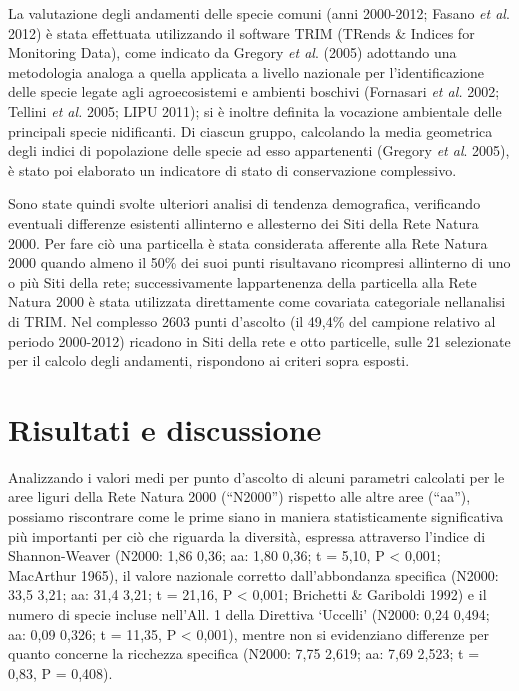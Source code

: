La valutazione degli andamenti delle specie comuni (anni 2000-2012;
Fasano \textit{et al}. 2012) \`e stata effettuata utilizzando il
software TRIM (TRends \& Indices for Monitoring Data), come indicato da
Gregory \textit{et al}. (2005) adottando una metodologia analoga a
quella applicata a livello nazionale per
l{\textquoteright}identificazione delle specie legate agli
agroecosistemi e ambienti boschivi (Fornasari \textit{et al.} 2002;
Tellini \textit{et al.} 2005; LIPU 2011); si \`e inoltre definita la
vocazione ambientale delle principali specie nidificanti. Di ciascun
gruppo, calcolando la media geometrica degli indici di popolazione
delle specie ad esso appartenenti (Gregory \textit{et al}. 2005), \`e
stato poi elaborato un indicatore\textbf{ }di stato di conservazione
complessivo.

Sono state quindi svolte ulteriori analisi di tendenza demografica,
verificando eventuali differenze esistenti all{\textquotesingle}interno
e all{\textquotesingle}esterno dei Siti della Rete Natura 2000. Per
fare ci\`o una particella \`e stata considerata afferente alla Rete
Natura 2000 quando almeno il 50\% dei suoi punti risultavano ricompresi
all{\textquotesingle}interno di uno o pi\`u Siti della rete;
successivamente l{\textquotesingle}appartenenza della particella alla
Rete Natura 2000 \`e stata utilizzata direttamente come covariata
categoriale nell{\textquotesingle}analisi di TRIM. Nel complesso 2603
punti d{\textquoteright}ascolto (il 49,4\% del campione relativo al
periodo 2000-2012) ricadono in Siti della rete e otto particelle, sulle
21 selezionate per il calcolo degli andamenti, rispondono ai criteri
sopra esposti.

\section*{Risultati e discussione}

Analizzando i valori medi per punto d{\textquoteright}ascolto di alcuni
parametri calcolati per le aree liguri della Rete Natura 2000
({\textquotedblleft}N2000{\textquotedblright}) rispetto alle altre aree
({\textquotedblleft}aa{\textquotedblright}), possiamo riscontrare come
le prime siano in maniera statisticamente significativa pi\`u
importanti per ci\`o che riguarda la diversit\`a, espressa attraverso
l{\textquoteright}indice di Shannon-Weaver (N2000: 1,86 {\textpm} 0,36;
aa: 1,80 {\textpm} 0,36;  t = 5,10, P {\textless} 0,001; MacArthur
1965), il valore nazionale corretto dall{\textquoteright}abbondanza
specifica (N2000: 33,5 {\textpm} 3,21; aa: 31,4 {\textpm} 3,21;  t =
21,16, P {\textless} 0,001; Brichetti \& Gariboldi 1992) e il numero di
specie incluse nell{\textquoteright}All. 1 della Direttiva
{\textquoteleft}Uccelli{\textquoteright} (N2000: 0,24 {\textpm} 0,494;
aa: 0,09 {\textpm} 0,326;  t = 11,35, P {\textless} 0,001), mentre non
si evidenziano differenze per quanto concerne la ricchezza specifica
(N2000: 7,75 {\textpm} 2,619; aa: 7,69 {\textpm} 2,523;  t = 0,83, P =
0,408). 

